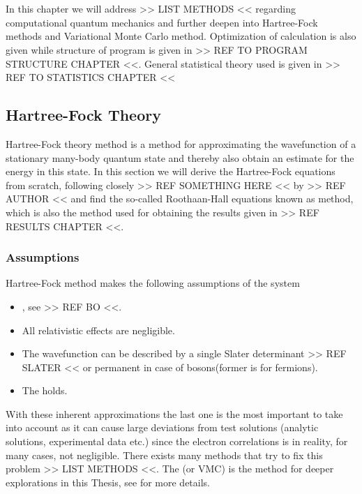 \chapter{\label{chapter:4}}
    In this chapter we will address >> LIST METHODS << regarding computational
    quantum mechanics and further deepen into Hartree-Fock methods and
    Variational Monte Carlo method. Optimization of calculation is also given
    while structure of program is given in >> REF TO PROGRAM STRUCTURE CHAPTER
    <<. General statistical theory used is given in >> REF TO STATISTICS CHAPTER <<

\section{Hartree-Fock Theory}
    Hartree-Fock theory method is a method for approximating the wavefunction
    of a stationary many-body quantum state and thereby also obtain an estimate
    for the energy in this state. In this section we will derive the
    Hartree-Fock equations from scratch, following closely >> REF SOMETHING
    HERE << by >> REF AUTHOR << and find the so-called Roothaan-Hall equations
    known as  method, which is also the method
    used for obtaining the results given in >> REF RESULTS CHAPTER <<.

    \subsection{Assumptions}
        Hartree-Fock method makes the following assumptions of the system
            \begin{itemize}
                \item {}, see >> REF BO <<.
                \item All relativistic effects are negligible.
                \item The wavefunction can be described by a single Slater
                    determinant >> REF SLATER << or permanent in case of
                    bosons(former is for fermions).
                \item The  holds.
            \end{itemize}
        With these inherent approximations the last one is the most important
        to take into account as it can cause large deviations from test
        solutions (analytic solutions, experimental data etc.) since the
        electron correlations is in reality, for many cases, not negligible.
        There exists many methods that try to fix this problem >> LIST METHODS
        <<. The  (or VMC) is the method for
        deeper explorations in this Thesis, see  for more details.

